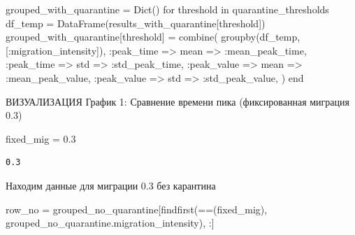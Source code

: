 \documentclass[
  12pt,
  a4paper,
  DIV=11,
  numbers=noendperiod]{scrreprt}
\newenvironment{Shaded}{\begin{snugshade}}{\end{snugshade}}
\newcommand{\ControlFlowTok}[1]{\textcolor[rgb]{0.00,0.23,0.31}{#1}}
\newcommand{\FloatTok}[1]{\textcolor[rgb]{0.68,0.00,0.00}{#1}}
\newcommand{\FunctionTok}[1]{\textcolor[rgb]{0.28,0.35,0.67}{#1}}
\newcommand{\KeywordTok}[1]{\textcolor[rgb]{0.00,0.23,0.31}{#1}}
\newcommand{\NormalTok}[1]{\textcolor[rgb]{0.00,0.23,0.31}{#1}}
\newcommand{\OperatorTok}[1]{\textcolor[rgb]{0.37,0.37,0.37}{#1}}
\begin{document}
\begin{Shaded}
\begin{Highlighting}[]
\NormalTok{grouped\_with\_quarantine }\OperatorTok{=} \FunctionTok{Dict}\NormalTok{()}
\ControlFlowTok{for}\NormalTok{ threshold }\KeywordTok{in}\NormalTok{ quarantine\_thresholds}
\NormalTok{    df\_temp }\OperatorTok{=} \FunctionTok{DataFrame}\NormalTok{(results\_with\_quarantine[threshold])}
\NormalTok{    grouped\_with\_quarantine[threshold] }\OperatorTok{=} \FunctionTok{combine}\NormalTok{(}
        \FunctionTok{groupby}\NormalTok{(df\_temp, [}\OperatorTok{:}\NormalTok{migration\_intensity]),}
        \OperatorTok{:}\NormalTok{peak\_time }\OperatorTok{=\textgreater{}}\NormalTok{ mean }\OperatorTok{=\textgreater{}} \OperatorTok{:}\NormalTok{mean\_peak\_time,}
        \OperatorTok{:}\NormalTok{peak\_time }\OperatorTok{=\textgreater{}}\NormalTok{ std }\OperatorTok{=\textgreater{}} \OperatorTok{:}\NormalTok{std\_peak\_time,}
        \OperatorTok{:}\NormalTok{peak\_value }\OperatorTok{=\textgreater{}}\NormalTok{ mean }\OperatorTok{=\textgreater{}} \OperatorTok{:}\NormalTok{mean\_peak\_value,}
        \OperatorTok{:}\NormalTok{peak\_value }\OperatorTok{=\textgreater{}}\NormalTok{ std }\OperatorTok{=\textgreater{}} \OperatorTok{:}\NormalTok{std\_peak\_value,}
\NormalTok{    )}
\ControlFlowTok{end}
\end{Highlighting}
\end{Shaded}

ВИЗУАЛИЗАЦИЯ График 1: Сравнение времени пика (фиксированная миграция
0.3)

\begin{Shaded}
\begin{Highlighting}[]
\NormalTok{fixed\_mig }\OperatorTok{=} \FloatTok{0.3}
\end{Highlighting}
\end{Shaded}

\begin{verbatim}
0.3
\end{verbatim}

Находим данные для миграции 0.3 без карантина

\begin{Shaded}
\begin{Highlighting}[]
\NormalTok{row\_no }\OperatorTok{=}\NormalTok{ grouped\_no\_quarantine[}\FunctionTok{findfirst}\NormalTok{(}\OperatorTok{==}\NormalTok{(fixed\_mig), grouped\_no\_quarantine.migration\_intensity), }\OperatorTok{:}\NormalTok{]}
\end{Highlighting}
\end{Shaded}
\end{document}
